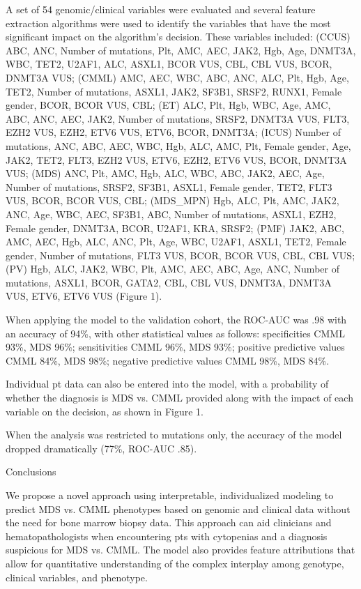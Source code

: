 A set of 54 genomic/clinical variables were evaluated and several feature extraction algorithms were used to identify the variables that have the most significant impact on the algorithm's decision. These variables included: (CCUS) ABC, ANC, Number of mutations, Plt, AMC, AEC, JAK2, Hgb, Age, DNMT3A, WBC, TET2, U2AF1, ALC, ASXL1, BCOR VUS, CBL, CBL VUS, BCOR, DNMT3A VUS; (CMML) AMC, AEC, WBC, ABC, ANC, ALC, Plt, Hgb, Age, TET2, Number of mutations, ASXL1, JAK2, SF3B1, SRSF2, RUNX1, Female gender, BCOR, BCOR VUS, CBL; (ET) ALC, Plt, Hgb, WBC, Age, AMC, ABC, ANC, AEC, JAK2, Number of mutations, SRSF2, DNMT3A VUS, FLT3, EZH2 VUS, EZH2, ETV6 VUS, ETV6, BCOR, DNMT3A; (ICUS) Number of mutations, ANC, ABC, AEC, WBC, Hgb, ALC, AMC, Plt, Female gender, Age, JAK2, TET2, FLT3, EZH2 VUS, ETV6, EZH2, ETV6 VUS, BCOR, DNMT3A VUS; (MDS) ANC, Plt, AMC, Hgb, ALC, WBC, ABC, JAK2, AEC, Age, Number of mutations, SRSF2, SF3B1, ASXL1, Female gender, TET2, FLT3 VUS, BCOR, BCOR VUS, CBL; (MDS_MPN) Hgb, ALC, Plt, AMC, JAK2, ANC, Age, WBC, AEC, SF3B1, ABC, Number of mutations, ASXL1, EZH2, Female gender, DNMT3A, BCOR, U2AF1, KRA, SRSF2; (PMF) JAK2, ABC, AMC, AEC, Hgb, ALC, ANC, Plt, Age, WBC, U2AF1, ASXL1, TET2, Female gender, Number of mutations, FLT3 VUS, BCOR, BCOR VUS, CBL, CBL VUS; (PV) Hgb, ALC, JAK2, WBC, Plt, AMC, AEC, ABC, Age, ANC, Number of mutations, ASXL1, BCOR, GATA2, CBL, CBL VUS, DNMT3A, DNMT3A VUS, ETV6, ETV6 VUS (Figure 1).

When applying the model to the validation cohort, the ROC-AUC was .98 with an accuracy of 94\%, with other statistical values as follows: specificities CMML 93\%, MDS 96\%; sensitivities CMML 96\%, MDS 93\%; positive predictive values CMML 84\%, MDS 98\%; negative predictive values CMML 98\%, MDS 84\%.

Individual pt data can also be entered into the model, with a probability of whether the diagnosis is MDS vs. CMML provided along with the impact of each variable on the decision, as shown in Figure 1.

When the analysis was restricted to mutations only, the accuracy of the model dropped dramatically (77\%, ROC-AUC .85).


Conclusions

We propose a novel approach using interpretable, individualized modeling to predict MDS vs. CMML phenotypes based on genomic and clinical data without the need for bone marrow biopsy data. This approach can aid clinicians and hematopathologists when encountering pts with cytopenias and a diagnosis suspicious for MDS vs. CMML. The model also provides feature attributions that allow for quantitative understanding of the complex interplay among genotype, clinical variables, and phenotype.


